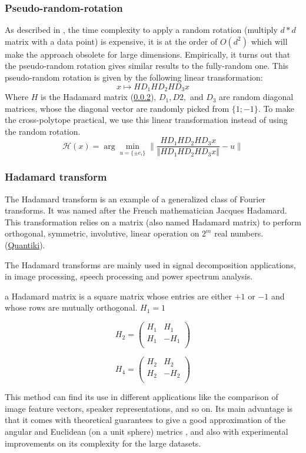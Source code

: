 \subsubsection{Pseudo-random-rotation}
As described in \citep{andoni_practicalsh_2015}, the time complexity to apply a
random rotation (multiply $d * d$ matrix with a data point) is expensive, it is
at the order of $O(d^2)$ which will make the approach obsolete for large
dimensions. Empirically, it turns out that the pseudo-random rotation gives
similar results to the fully-random one. This pseudo-random rotation is given by
the following linear transformation:
$$
    x \mapsto HD_1HD_2HD_3x
$$
Where $H$ is the Hadamard matrix (\ref{subsubsect:hadamard_transform}), $D_1, D2,$
and $D_3$ are random diagonal matrices, whose the diagonal vector are randomly
picked from $\lbrace 1; -1 \rbrace$. To make the cross-polytope practical, we
use this linear transformation instead of using the random rotation.
$$
    \mathcal{H}(x) = \arg \min_{u = \lbrace \pm e_i \rbrace} \lVert \frac{HD_1HD_2HD_3x}{\Vert{HD_1HD_2HD_3x} \Vert} - u \rVert
$$

\subsubsection{Hadamard transform}
\label{subsubsect:hadamard_transform}
The Hadamard transform is an example of a generalized class of Fourier
transforms. It was named after the French mathematician Jacques Hadamard. This
transformation relies on a matrix (also named Hadamard matrix) to perform
orthogonal, symmetric, involutive, linear operation on $2^m$ real numbers.
(\href{https://www.quantiki.org/wiki/hadamard}{Quantiki}).

The Hadamard transforms are mainly used in signal decomposition applications, in
image processing, speech processing and power spectrum analysis.

a Hadamard matrix is a square matrix whose entries are either $+1$ or $-1$ and whose
rows are mutually orthogonal. $H_1 = 1$

$$
    H_2 =
    \begin{pmatrix}
        H_1 & H_1   \\
        H_1 & - H_1 \\
    \end{pmatrix}
$$

$$
    H_4 =
    \begin{pmatrix}
        H_2 & H_2   \\
        H_2 & - H_2 \\
    \end{pmatrix}
$$

This method can find its use in different applications like the comparison of
image feature vectors, speaker representations, and so on. Its main advantage is
that it comes with theoretical guarantees to give a good approximation of the
angular and Euclidean (on a unit sphere) metrics , and also with experimental
improvements on its complexity for the large datasets.
\citep{andoni_practicalsh_2015}
